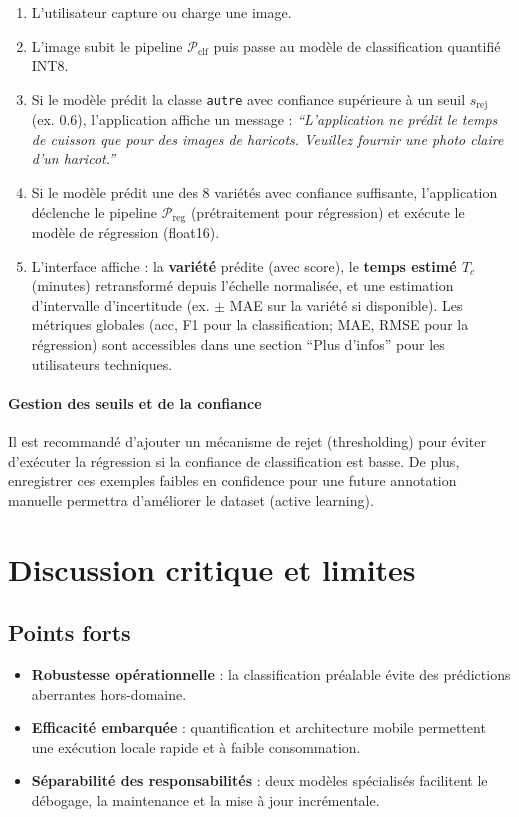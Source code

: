 \begin{enumerate}
    \item L'utilisateur capture ou charge une image.
    \item L'image subit le pipeline \(\mathcal{P}_{\text{clf}}\) puis passe au modèle de classification quantifié INT8.
    \item Si le modèle prédit la classe \texttt{autre} avec confiance supérieure à un seuil \(s_{\text{rej}}\) (ex. 0.6), l'application affiche un message : \emph{``L'application ne prédit le temps de cuisson que pour des images de haricots. Veuillez fournir une photo claire d'un haricot.''}
    \item Si le modèle prédit une des 8 variétés avec confiance suffisante, l'application déclenche le pipeline \(\mathcal{P}_{\text{reg}}\) (prétraitement pour régression) et exécute le modèle de régression (float16).
    \item L'interface affiche : la \textbf{variété} prédite (avec score), le \textbf{temps estimé $T_c$} (minutes) retransformé depuis l'échelle normalisée, et une estimation d'intervalle d'incertitude (ex. $\pm$ MAE sur la variété si disponible). Les métriques globales (acc, F1 pour la classification; MAE, RMSE pour la régression) sont accessibles dans une section ``Plus d'infos'' pour les utilisateurs techniques.
\end{enumerate}

\paragraph{Gestion des seuils et de la confiance}
Il est recommandé d'ajouter un mécanisme de rejet (thresholding) pour éviter d'exécuter la régression si la confiance de classification est basse. De plus, enregistrer ces exemples faibles en confidence pour une future annotation manuelle permettra d'améliorer le dataset (active learning).

\section{Discussion critique et limites}

\subsection{Points forts}
\begin{itemize}
    \item \textbf{Robustesse opérationnelle} : la classification préalable évite des prédictions aberrantes hors-domaine.
    \item \textbf{Efficacité embarquée} : quantification et architecture mobile permettent une exécution locale rapide et à faible consommation.
    \item \textbf{Séparabilité des responsabilités} : deux modèles spécialisés facilitent le débogage, la maintenance et la mise à jour incrémentale.
\end{itemize}

